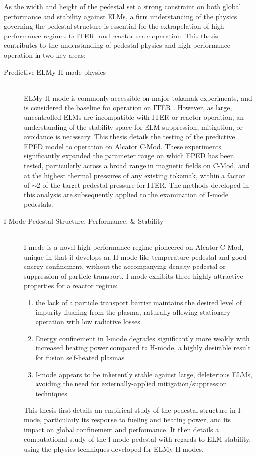 \documentclass[ twoside,openright,titlepage,numbers=noenddot,headinclude,%
                footinclude=true,cleardoublepage=empty,abstractoff, %
                BCOR=5mm,paper=letter,fontsize=11pt,%
                ngerman,american,%
                ]{scrreprt}
\newcommand{\gnote}[1]{\graffito{\textcolor{red}{#1}}}
\begin{document}
As the width and height of the pedestal set a strong constraint on both global performance and stability against ELMs, a firm understanding of the physics governing the pedestal structure is essential for the extrapolation of high-performance regimes to ITER- and reactor-scale operation.  This thesis contributes to the understanding of pedestal physics and high-performance operation in two key areas:\gnote{move these into sections, bullet results for each chapter?}

\begin{description}
 \item[Predictive ELMy H-mode physics] \hfill \\
 ELMy H-mode is commonly accessible on major tokamak experiments, and is considered the baseline for operation on ITER \cite{Shimada2007}.  However, as large, uncontrolled ELMs are incompatible with ITER or reactor operation, an understanding of the stability space for ELM suppression, mitigation, or avoidance is necessary.  This thesis details the testing of the predictive EPED model to operation on Alcator C-Mod.  These experiments significantly expanded the parameter range on which EPED has been tested, particularly across a broad range in magnetic fields on C-Mod, and at the highest thermal pressures of any existing tokamak, within a factor of $\sim 2$ of the target pedestal pressure for ITER.  The methods developed in this analysis are subsequently applied to the examination of I-mode pedestals.
 \item[I-Mode Pedestal Structure, Performance, \& Stability] \hfill \\
 I-mode \cite{Whyte2010} is a novel high-performance regime pioneered on Alcator C-Mod, unique in that it develops an H-mode-like temperature pedestal and good energy confinement, without the accompanying density pedestal or suppression of particle transport.  I-mode exhibits three highly attractive properties for a reactor regime:
 
 \begin{enumerate}
  \item the lack of a particle transport barrier maintains the desired level of impurity flushing from the plasma, naturally allowing stationary operation with low radiative losses
  \item Energy confinement in I-mode degrades significantly more weakly with increased heating power compared to H-mode, a highly desirable result for fusion self-heated plasmas
  \item I-mode appears to be inherently stable against large, deleterious ELMs, avoiding the need for externally-applied mitigation/suppression techniques
 \end{enumerate}
 
This thesis first details an empirical study of the pedestal structure in I-mode, particularly its response to fueling and heating power, and its impact on global confinement and performance.  It then details a computational study of the I-mode pedestal with regards to ELM stability, using the physics techniques developed for ELMy H-modes.
\end{description}
\end{document}
